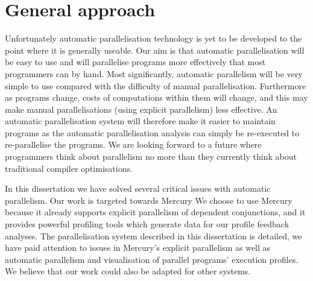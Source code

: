 

\section{General approach}
\label{sec:intro_general_approach}

Unfortunately automatic parallelisation technology is yet to be developed to the
point where it is generally useable.
Our aim is that automatic parallelisation will be easy to use and
will parallelise programs more effectively that most programmers can by
hand.
Most significantly,
automatic parallelism will be very simple to use compared with the
difficulty of manual parallelisation.
Furthermore as programs change,
costs of computations within them will change,
and this may make manual parallelisations (using explicit parallelism) less
effective.
An automatic parallelisation system will therefore make it easier to
maintain programs as the automatic parallelisation analysis can simply be
re-executed to re-parallelise the programs.
We are looking forward to a future where programmers think about
parallelism no more than they currently think about traditional compiler
optimisations.

In this dissertation we have solved several critical issues with automatic
parallelism.
Our work is targeted towards Mercury
We choose to use Mercury because
it already supports explicit parallelism of dependent conjunctions,
and it provides powerful profiling tools which generate data for our profile
feedback analyses.
The parallelisation system described in this dissertation is detailed,
we have paid attention to issues in Mercury's explicit parallelism as well
as automatic parallelism and visualisation of parallel programs' execution
profiles.
We believe that our work could also be adapted for other systems.

